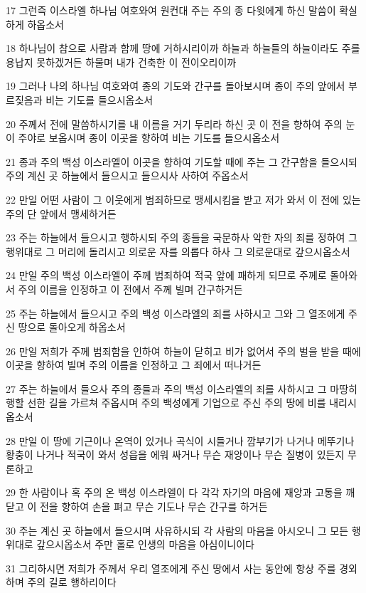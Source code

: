\par 17 그런즉 이스라엘 하나님 여호와여 원컨대 주는 주의 종 다윗에게 하신 말씀이 확실하게 하옵소서
\par 18 하나님이 참으로 사람과 함께 땅에 거하시리이까 하늘과 하늘들의 하늘이라도 주를 용납지 못하겠거든 하물며 내가 건축한 이 전이오리이까
\par 19 그러나 나의 하나님 여호와여 종의 기도와 간구를 돌아보시며 종이 주의 앞에서 부르짖음과 비는 기도를 들으시옵소서
\par 20 주께서 전에 말씀하시기를 내 이름을 거기 두리라 하신 곳 이 전을 향하여 주의 눈이 주야로 보옵시며 종이 이곳을 향하여 비는 기도를 들으시옵소서
\par 21 종과 주의 백성 이스라엘이 이곳을 향하여 기도할 때에 주는 그 간구함을 들으시되 주의 계신 곳 하늘에서 들으시고 들으시사 사하여 주옵소서
\par 22 만일 어떤 사람이 그 이웃에게 범죄하므로 맹세시킴을 받고 저가 와서 이 전에 있는 주의 단 앞에서 맹세하거든
\par 23 주는 하늘에서 들으시고 행하시되 주의 종들을 국문하사 악한 자의 죄를 정하여 그 행위대로 그 머리에 돌리시고 의로운 자를 의롭다 하사 그 의로운대로 갚으시옵소서
\par 24 만일 주의 백성 이스라엘이 주께 범죄하여 적국 앞에 패하게 되므로 주께로 돌아와서 주의 이름을 인정하고 이 전에서 주께 빌며 간구하거든
\par 25 주는 하늘에서 들으시고 주의 백성 이스라엘의 죄를 사하시고 그와 그 열조에게 주신 땅으로 돌아오게 하옵소서
\par 26 만일 저희가 주께 범죄함을 인하여 하늘이 닫히고 비가 없어서 주의 벌을 받을 때에 이곳을 향하여 빌며 주의 이름을 인정하고 그 죄에서 떠나거든
\par 27 주는 하늘에서 들으사 주의 종들과 주의 백성 이스라엘의 죄를 사하시고 그 마땅히 행할 선한 길을 가르쳐 주옵시며 주의 백성에게 기업으로 주신 주의 땅에 비를 내리시옵소서
\par 28 만일 이 땅에 기근이나 온역이 있거나 곡식이 시들거나 깜부기가 나거나 메뚜기나 황충이 나거나 적국이 와서 성읍을 에워 싸거나 무슨 재앙이나 무슨 질병이 있든지 무론하고
\par 29 한 사람이나 혹 주의 온 백성 이스라엘이 다 각각 자기의 마음에 재앙과 고통을 깨닫고 이 전을 향하여 손을 펴고 무슨 기도나 무슨 간구를 하거든
\par 30 주는 계신 곳 하늘에서 들으시며 사유하시되 각 사람의 마음을 아시오니 그 모든 행위대로 갚으시옵소서 주만 홀로 인생의 마음을 아심이니이다
\par 31 그리하시면 저희가 주께서 우리 열조에게 주신 땅에서 사는 동안에 항상 주를 경외하며 주의 길로 행하리이다
